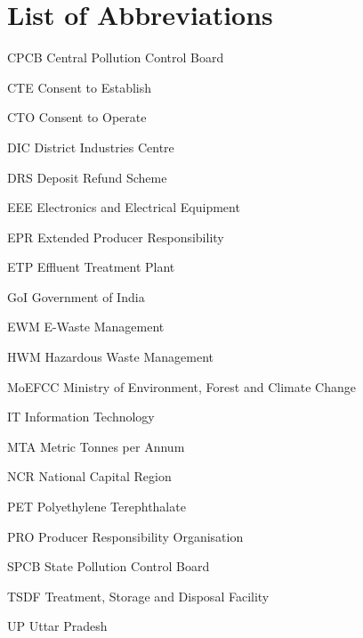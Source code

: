\documentclass[a4paper, 12pt]{article}
\begin{document}
        \section*{List of Abbreviations}
        
         
        \begin{abbrv}
         
        \item[CPCB]			Central Pollution Control Board
        \item[CTE]				Consent to Establish
        \item[CTO]			Consent to Operate
        \item[DIC]				District Industries Centre
        \item[DRS]			Deposit Refund Scheme
        \item[EEE]				Electronics and Electrical Equipment 
        \item[EPR]				Extended Producer Responsibility
        \item[ETP]				Effluent Treatment Plant 
        \item[GoI]				Government of India
        \item[EWM]			E-Waste Management
        \item[HWM]			Hazardous Waste Management
        \item[MoEFCC]			Ministry of Environment, Forest and Climate Change
        \item[IT]				Information Technology 
        \item[MTA]				Metric Tonnes per Annum
        \item[NCR]			National Capital Region
        \item[PET]				Polyethylene Terephthalate
        \item[PRO]			Producer Responsibility Organisation
        \item[SPCB]			State Pollution Control Board
        \item[TSDF]			Treatment, Storage and Disposal Facility
        \item[UP]				Uttar Pradesh
        
        
         
        \end{abbrv}
        
                    
                    \newpage
\end{document}
